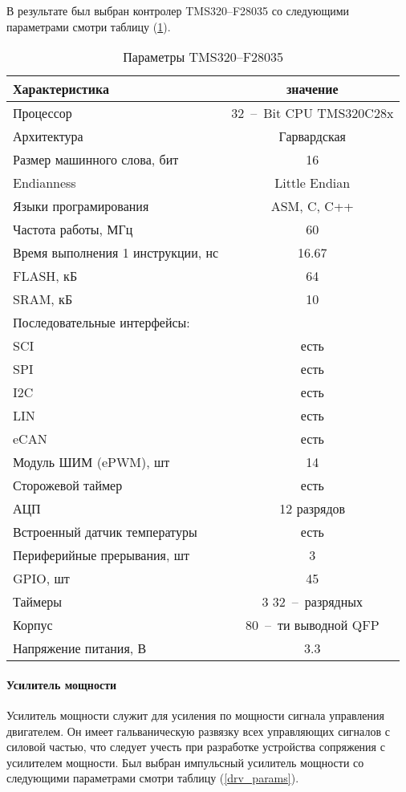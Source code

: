 В результате был выбран контролер TMS320--F28035 со следующими параметрами
смотри таблицу (\ref{mcu_params}).
\begin{table}[ht!]
    \centering
    \begin{tabular}{|l|c|}
        \hline
        Характеристика & значение \\
        \hline \hline
        Процессор & 32~--~Bit CPU TMS320C28x \\
        Архитектура & Гарвардская \\
        Размер машинного слова, бит & 16 \\
        Endianness & Little Endian \\
        Языки програмирования & ASM, C, C++ \\
        Частота работы, МГц & 60 \\
        Время выполнения 1 инструкции, нс & 16.67 \\
        \hline
        FLASH, кБ & 64 \\
        SRAM,  кБ & 10 \\
        \hline
        Последовательные интерфейсы: & \\
        SCI  & есть \\
        SPI  & есть \\
        I2C  & есть \\
        LIN  & есть \\
        eCAN & есть \\
        \hline
        Модуль ШИМ (ePWM), шт & 14 \\
        \hline
        Сторожевой таймер & есть \\
        \hline
        АЦП & 12 разрядов \\
        \hline
        Встроенный датчик температуры & есть \\
        \hline
        Периферийные прерывания, шт & 3 \\
        \hline
        GPIO, шт  & 45 \\
        \hline
        Таймеры & 3 32~--~разрядных \\
        \hline
        Корпус & 80~--~ти выводной QFP \\
        \hline
        Напряжение питания, В & 3.3 \\
        \hline
    \end{tabular}
    \caption{Параметры TMS320--F28035}
    \label{mcu_params}
\end{table}


\paragraph{Усилитель мощности}
Усилитель мощности служит для усиления по мощности сигнала управления
двигателем. Он имеет гальваническую развязку всех управляющих сигналов с силовой
частью, что следует учесть при разработке устройства сопряжения с усилителем
мощности.
Был выбран импульсный усилитель мощности со следующими параметрами
смотри таблицу (\ref{drv_params}).

